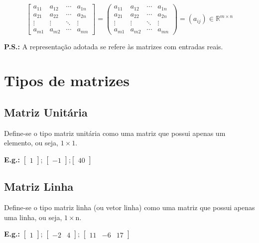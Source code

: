 \documentclass[a4paper,12pt]{article}
\begin{document}
$$ \begin{bmatrix}
 a_{11} & a_{12} & \cdots & a_{1n} \\
 a_{21} & a_{22} & \cdots & a_{2n} \\
 \vdots & \vdots & \ddots & \vdots \\
 a_{m1} & a_{m2} & \cdots & a_{mn}
 \end{bmatrix} = 
\left( \begin{array}{rrrr}
 a_{11} & a_{12} & \cdots & a_{1n} \\
 a_{21} & a_{22} & \cdots & a_{2n} \\
 \vdots & \vdots & \ddots & \vdots \\
 a_{m1} & a_{m2} & \cdots & a_{mn}
 \end{array} \right) =\left(a_{ij}\right) \in \mathbb{R}^{m \times n}$$
 
 \textbf{P.S.:} A representação adotada se refere às matrizes com entradas reais.

\newpage

\section{Tipos de matrizes}

\subsection{Matriz Unitária}

Define-se o tipo matriz unitária como uma matriz que possui apenas um elemento, ou seja, $ 1 \times 1 $.

\textbf{E.g.:} $ \begin{bmatrix}
1
\end{bmatrix} $; $ \begin{bmatrix}
-1
\end{bmatrix} $;$ \begin{bmatrix}
40
\end{bmatrix} $

\subsection{Matriz Linha}

Define-se o tipo matriz linha (ou vetor linha) como uma matriz que possui apenas uma linha, ou seja, $ 1 \times \text{n} $.

\textbf{E.g.:} $ \begin{bmatrix}
1
\end{bmatrix} $; $ \begin{bmatrix}
-2 & 4 
\end{bmatrix} $; $ \begin{bmatrix}
11 & -6 & 17
\end{bmatrix} $
\end{document}
